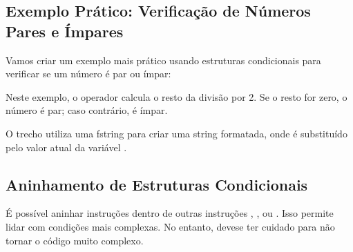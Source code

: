 \documentclass[letterpaper,10pt,english]{jupyterBook}
\begin{document}
\subsection{Exemplo Prático: Verificação de Números Pares e Ímpares}
\label{\detokenize{chapters/ch4/ch4:exemplo-pratico-verificacao-de-numeros-pares-e-impares}}
\sphinxAtStartPar
Vamos criar um exemplo mais prático usando estruturas condicionais para verificar se um número é par ou ímpar:

\begin{sphinxVerbatim}[commandchars=\\\{\}]
  

     
\end{sphinxVerbatim}

\begin{sphinxVerbatim}[commandchars=\\\{\}]
    
\end{sphinxVerbatim}

\sphinxAtStartPar
Neste exemplo, o operador \sphinxcode{\sphinxupquote{\%}} calcula o resto da divisão por 2. Se o resto for zero, o número é par; caso contrário, é ímpar.

\sphinxAtStartPar
{} O trecho  utiliza uma f\sphinxhyphen{}string para criar uma string formatada, onde  é substituído pelo valor atual da variável .


\subsection{Aninhamento de Estruturas Condicionais}
\label{\detokenize{chapters/ch4/ch4:aninhamento-de-estruturas-condicionais}}
\sphinxAtStartPar
É possível aninhar instruções  dentro de outras instruções , , ou . Isso permite lidar com condições mais complexas. No entanto, deve\sphinxhyphen{}se ter cuidado para não tornar o código muito complexo.
\end{document}
